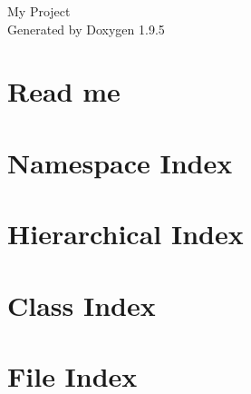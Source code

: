 \documentclass[twoside]{book}
\newcommand{\+}{\discretionary{\mbox{\scriptsize$\hookleftarrow$}}{}{}}
\newcommand{\clearemptydoublepage}{%
    \newpage{\pagestyle{empty}\cleardoublepage}%
  }
\begin{document}
  \raggedbottom
    \hypersetup{pageanchor=false,
                bookmarksnumbered=true,
                pdfencoding=unicode
               }
  \begin{titlepage}
  \vspace*{7cm}
  \begin{center}%
  {\Large My Project}\\
  \vspace*{1cm}
  {\large Generated by Doxygen 1.9.5}\\
  \end{center}
  \end{titlepage}
  \clearemptydoublepage
  \tableofcontents
  \clearemptydoublepage
  \hypersetup{pageanchor=true}
\chapter{Read me}
\label{md__readme}

\chapter{Namespace Index}

\chapter{Hierarchical Index}

\chapter{Class Index}

\chapter{File Index}

\end{document}

